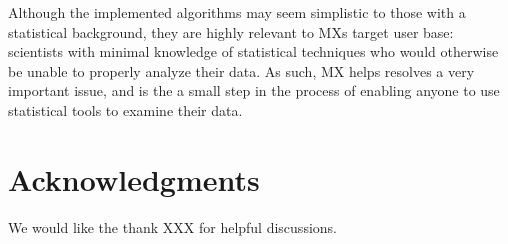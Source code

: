 \documentclass[twoside,leqno,twocolumn]{article}
\begin{document}
Although the implemented algorithms may seem simplistic to those with a statistical background, they are highly relevant to MXs target user base: scientists with minimal knowledge of statistical techniques who would otherwise be unable to properly analyze their data. As such, MX helps resolves a very important issue, and is the a small step in the process of enabling anyone to use statistical tools to examine their data.

\section{Acknowledgments}
\label{sec:ack}
We would like the thank XXX for helpful discussions.



\end{document}
